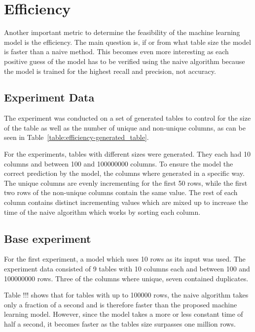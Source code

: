 \section{Efficiency}\label{sec:efficiency}
Another important metric to determine the feasibility of the machine learning model is the efficiency. The main question is, if or from what table size the model is faster than a naive method. This becomes even more interesting as each positive guess of the model has to be verified using the naive algorithm because the model is trained for the highest recall and precision, not accuracy. %


\subsection{Experiment Data}\label{subsec:efficiency-experiment_data}
The experiment was conducted on a set of generated tables to control for the size of the table as well as the number of unique and non-unique columns, as can be seen in Table~\ref{table:efficiency-generated_table}.

For the experiments, tables with different sizes were generated. They each had \num{10} columns and between \num{100} and \num{100000000} columns. To ensure the model the correct prediction by the model, the columns where generated in a specific way. The unique columns are evenly incrementing for the first \num{50} rows, while the first two rows of the non-unique columns contain the same value. The rest of each column contains distinct incrementing values which are mixed up to increase the time of the naive algorithm which works by sorting each column.




\subsection{Base experiment}\label{subsec:efficiency-base_experiment} %
For the first experiment, a model which uses 10 rows as its input was used. The experiment data consisted of \num{9} tables with \num{10} columns each and between \num{100} and \num{100000000} rows. Three of the columns where unique, seven contained duplicates.

Table !!! shows that for tables with up to \num{100000} rows, the naive algorithm takes only a fraction of a second and is therefore faster than the proposed machine learning model. However, since the model takes a more or less constant time of half a second, it becomes faster as the tables size surpasses one million rows.

